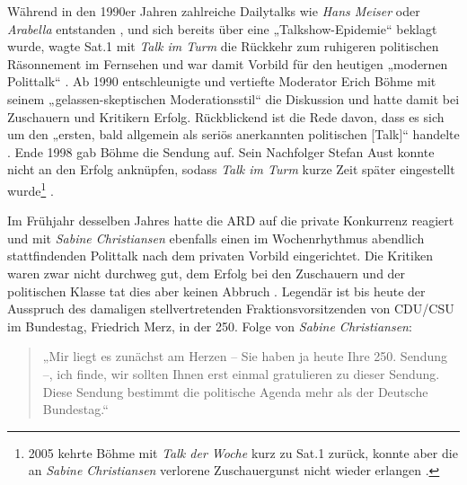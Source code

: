 Während in den 1990er Jahren zahlreiche Dailytalks wie \textit{Hans Meiser} oder \textit{Arabella} entstanden \parencite[332-344]{kellerGeschichteTalkshowDeutschland2009}, und sich bereits über eine „Talkshow-Epidemie“ \parencite{stolleMeisenUndMystinguetten1990} beklagt wurde, wagte Sat.1 mit \textit{Talk im Turm} die Rückkehr zum ruhigeren politischen Räsonnement im Fernsehen und war damit Vorbild für den heutigen „modernen Polittalk“ \parencite{wickSchlussMitStreit2006}. Ab 1990 entschleunigte und vertiefte Moderator Erich Böhme mit seinem „gelassen-skeptischen Moderationsstil“ \parencite[301]{kellerGeschichteTalkshowDeutschland2009} die Diskussion und hatte damit bei Zuschauern und Kritikern Erfolg. Rückblickend ist die Rede davon, dass es sich um den „ersten, bald allgemein als seriös anerkannten politischen [Talk]“ handelte \parencite[13]{gaeblerUndUnserenTaeglichen2011}. Ende 1998 gab Böhme die Sendung auf. Sein Nachfolger Stefan Aust konnte nicht an den Erfolg anknüpfen, sodass \textit{Talk im Turm} kurze Zeit später eingestellt wurde\footnote{2005 kehrte Böhme mit \textit{Talk der Woche} kurz zu Sat.1 zurück, konnte aber die an \textit{Sabine Christiansen} verlorene Zuschauergunst nicht wieder erlangen \parencite[303]{kellerGeschichteTalkshowDeutschland2009}.} \parencite[300-303]{kellerGeschichteTalkshowDeutschland2009}.

Im Frühjahr desselben Jahres hatte die ARD auf die private Konkurrenz reagiert und mit \textit{Sabine Christiansen} ebenfalls einen im Wochenrhythmus abendlich stattfindenden Polittalk nach dem privaten Vorbild eingerichtet. Die Kritiken waren zwar nicht durchweg gut, dem Erfolg bei den Zuschauern und der politischen Klasse tat dies aber keinen Abbruch \parencite[301-304]{kellerGeschichteTalkshowDeutschland2009}. Legendär ist bis heute der Ausspruch des damaligen stellvertretenden Fraktionsvorsitzenden von CDU/CSU im Bundestag, Friedrich Merz, in der 250. Folge von \textit{Sabine Christiansen}:

\begin{quote}
	„Mir liegt es zunächst am Herzen – Sie haben ja heute Ihre 250. Sendung –, ich finde, wir sollten Ihnen erst einmal gratulieren zu dieser Sendung. Diese Sendung bestimmt die politische Agenda mehr als der Deutsche Bundestag.“ \parencite[zit. nach][15]{gaeblerUndUnserenTaeglichen2011}
\end{quote}

